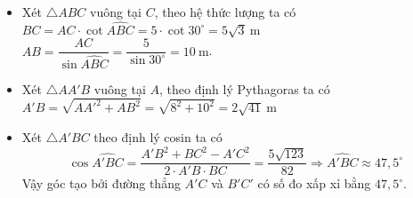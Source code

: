 \begin{ex}
{{\begin{tikzpicture}[line cap=round,line join=round,font=\footnotesize,>=stealth,scale=0.8]
		\end{tikzpicture}}\noindent
		\begin{itemize}
			\item Xét $\triangle ABC$ vuông tại $C$, theo hệ thức lượng ta có\\
			$BC=AC\cdot \cot \widehat{ABC}=5\cdot \cot 30^\circ=5\sqrt{3}\mathrm{~m}$ \\
			$AB=\dfrac{AC}{\sin \widehat{ABC}}=\dfrac{5}{\sin 30^\circ}=10\mathrm{~m}$.
			\item Xét $\triangle AA'B$ vuông tại $A$, theo định lý Pythagoras ta có\\
			$A'B=\sqrt{AA'^2+AB^2}=\sqrt{8^2+10^2}=2\sqrt{41}\mathrm{~m}$ 
			\item Xét $\triangle A'BC$ theo định lý cosin ta có
			\[\cos \widehat{A'BC}=\dfrac{A'B^2+BC^2-A'C^2}{2\cdot A'B\cdot BC}=\dfrac{5\sqrt{123}}{82} \Rightarrow \widehat{A'BC}\approx 47{,}5^\circ
			\]
			Vậy góc tạo bởi đường thẳng $A'C$ và $B'C'$ có số đo xấp xỉ bằng $47{,}5^\circ$.
		\end{itemize}
	}
\end{ex}
